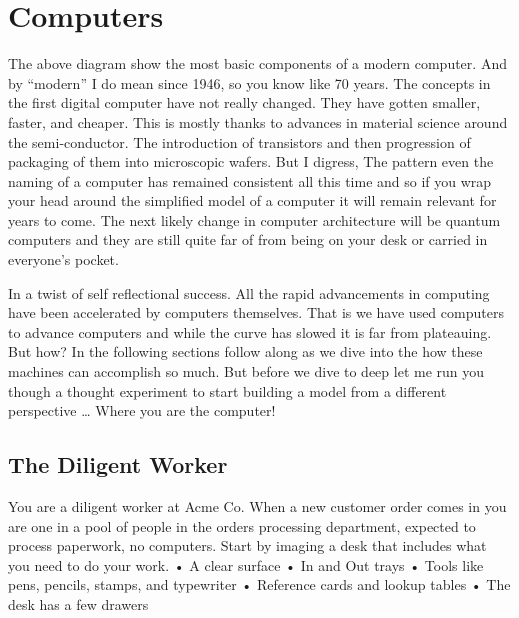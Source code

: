 \chapter{Computers}


The above diagram show the most basic components of a modern computer. And by “modern” I do mean since 1946, so you know like 70 years. The concepts in the first digital computer have not really changed. They have gotten smaller, faster, and cheaper. This is mostly thanks to advances in material science around the semi-conductor. The introduction of transistors and then progression of packaging of them into microscopic wafers. But I digress, The pattern even the naming of a computer has remained consistent all this time and so if you wrap your head around the simplified model of a computer it will remain relevant for years to come. The next likely change in computer architecture will be quantum computers and they are still quite far of from being on your desk or carried in everyone's pocket.

In a twist of self reflectional success. All the rapid advancements in computing have been accelerated by computers themselves. That is we have used computers to advance computers and while the curve has slowed it is far from plateauing. 
But how? In the following sections follow along as we dive into the how these machines can accomplish so much. But before we dive to deep let me run you though a thought experiment to start building a model from a different perspective … Where you are the computer!

\section{The Diligent Worker}

You are a diligent worker at Acme Co. When a new customer order comes in you are one in a pool of people in the orders processing department, expected to process paperwork, no computers. 
Start by imaging a desk that includes what you need to do your work.
    • A clear surface
    • In and Out trays 
    • Tools like pens, pencils, stamps, and typewriter
    • Reference cards and lookup tables
    • The desk has a few drawers
      
